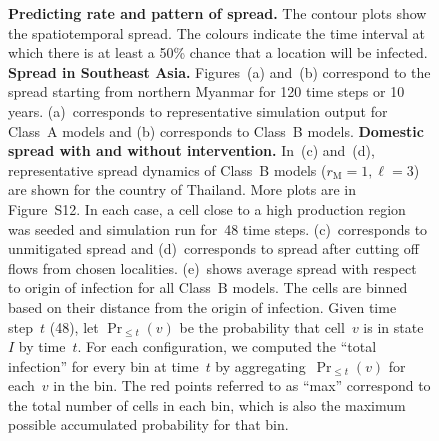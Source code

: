 \documentclass[11pt]{article}
\newcommand{\mooreRange}{r_\mathrm{M}}
\theoremstyle{definition}
\begin{document}
\begin{figure}[ht]
\begin{subfigure}[b]{.3\textwidth}
\caption{\label{fig:thlBContourBox}} %
\end{subfigure}
\caption{\textbf{Predicting rate and pattern of spread.}
The contour plots show the spatiotemporal spread. The colours indicate the
time interval at which there is at least a 50\% chance that a location will
be infected. {\bf Spread in Southeast Asia.} Figures~(a) and~(b) correspond
to the spread starting from northern Myanmar for 120 time steps or 10
years.  (a)~corresponds to representative simulation output for Class~A
models and (b) corresponds to Class~B models. {\bf Domestic spread with and
without intervention.} In~(c) and~(d), representative spread dynamics of
Class~B models ($\mooreRange=1, \ell=3$) are shown for the country of
Thailand. More plots are in Figure~S12. In each case, a
cell close to a high production region was seeded and simulation run for~48
time steps. (c)~corresponds to unmitigated spread and (d)~corresponds to
spread after cutting off flows from chosen localities. (e)~shows average
spread with respect to origin of infection for all Class~B models. The
cells are binned based on their distance from the origin of infection.
Given time step~$t$ (48), let $\Pr_{\le t}(v)$ be the probability that
cell~$v$ is in state~$I$ by time~$t$. For each configuration, we computed
the ``total infection'' for every bin at time~$t$ by aggregating~$\Pr_{\le
t}(v)$ for each~$v$ in the bin. The red points referred to as ``max''
correspond to the total number of cells in each bin, which is also the
maximum possible accumulated probability for that bin.
\label{fig:spread}}
\end{figure}
\end{document}

